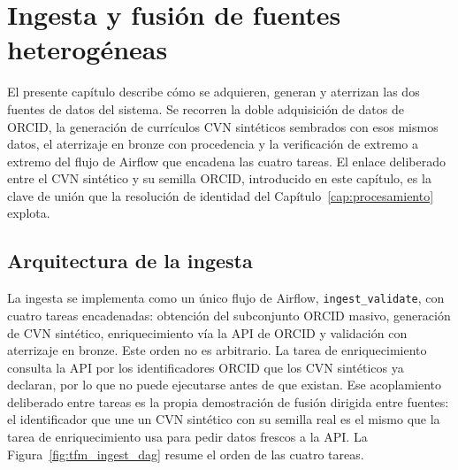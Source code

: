 \chapter{Ingesta y fusión de fuentes heterogéneas}
\label{cap:ingesta}

El presente capítulo describe cómo se adquieren, generan y aterrizan las
dos fuentes de datos del sistema. Se recorren la doble adquisición de
datos de ORCID, la generación de currículos CVN sintéticos sembrados con
esos mismos datos, el aterrizaje en bronze con procedencia y la
verificación de extremo a extremo del flujo de Airflow que encadena las
cuatro tareas. El enlace deliberado entre el CVN sintético y su semilla
ORCID, introducido en este capítulo, es la clave de unión que la
resolución de identidad del Capítulo~\ref{cap:procesamiento} explota.

\section{Arquitectura de la ingesta}
\label{sec:ingesta_arquitectura}

La ingesta se implementa como un único flujo de Airflow,
\texttt{ingest\_validate}, con cuatro tareas encadenadas: obtención del
subconjunto ORCID masivo, generación de CVN sintético, enriquecimiento vía
la API de ORCID y validación con aterrizaje en bronze. Este orden no es
arbitrario. La tarea de enriquecimiento consulta la API por los
identificadores ORCID que los CVN sintéticos ya declaran, por lo que no
puede ejecutarse antes de que existan. Ese acoplamiento deliberado entre tareas
es la propia demostración de fusión dirigida entre fuentes: el
identificador que une un CVN sintético con su semilla real es el mismo que
la tarea de enriquecimiento usa para pedir datos frescos a la API. La
Figura~\ref{fig:tfm_ingest_dag} resume el orden de las cuatro tareas.

